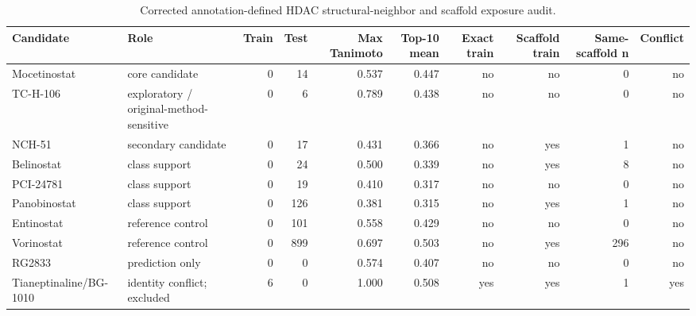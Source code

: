 \begingroup
\tiny
\begin{table}[H]
\centering
\caption{Corrected annotation-defined HDAC structural-neighbor and scaffold exposure audit.}
\label{tab:s_neighbor}
\begin{tabular}{@{}p{3.2cm}p{3.7cm}rrrrrrrr@{}}
\toprule
Candidate & Role & Train & Test & Max Tanimoto & Top-10 mean & Exact train & Scaffold train & Same-scaffold n & Conflict \\
\midrule
Mocetinostat & core candidate & 0 & 14 & 0.537 & 0.447 & no & no & 0 & no \\
TC-H-106 & exploratory / original-method-sensitive & 0 & 6 & 0.789 & 0.438 & no & no & 0 & no \\
NCH-51 & secondary candidate & 0 & 17 & 0.431 & 0.366 & no & yes & 1 & no \\
Belinostat & class support & 0 & 24 & 0.500 & 0.339 & no & yes & 8 & no \\
PCI-24781 & class support & 0 & 19 & 0.410 & 0.317 & no & no & 0 & no \\
Panobinostat & class support & 0 & 126 & 0.381 & 0.315 & no & yes & 1 & no \\
Entinostat & reference control & 0 & 101 & 0.558 & 0.429 & no & no & 0 & no \\
Vorinostat & reference control & 0 & 899 & 0.697 & 0.503 & no & yes & 296 & no \\
RG2833 & prediction only & 0 & 0 & 0.574 & 0.407 & no & no & 0 & no \\
Tianeptinaline/BG-1010 & identity conflict; excluded & 6 & 0 & 1.000 & 0.508 & yes & yes & 1 & yes \\
\bottomrule
\end{tabular}
\end{table}
\endgroup
